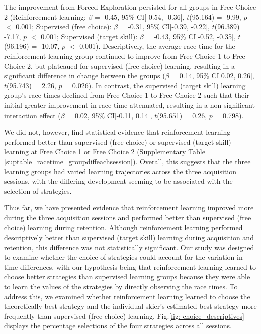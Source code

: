 The improvement from Forced Exploration persisted for all groups in Free Choice 2 (Reinforcement learning: $\beta$ = -0.45, 95\% CI[-0.54, -0.36], $t$(95.164) = -9.99, $p$ $<$ 0.001; Supervised (free choice): $\beta$ = -0.31, 95\% CI[-0.39, -0.22], $t$(96.389) = -7.17, $p$ $<$ 0.001; Supervised (target skill): $\beta$ = -0.43, 95\% CI[-0.52, -0.35], $t$(96.196) = -10.07, $p$ $<$ 0.001). Descriptively, the average race time for the reinforcement learning group continued to improve from Free Choice 1 to Free Choice 2,  but plateaued for supervised (free choice) learning, resulting in a significant difference in change between the groups ($\beta$ = 0.14, 95\% CI[0.02, 0.26], $t$(95.743) = 2.26, $p$ = 0.026). In contrast, the supervised (target skill) learning group's race times declined from Free Choice 1 to Free Choice 2 such that their initial greater improvement in race time  
attenuated, resulting in a non-significant interaction effect ($\beta$ = 0.02, 95\% CI[-0.11, 0.14], $t$(95.651) = 0.26, $p$ = 0.798).

We did not, however, find statistical evidence that reinforcement learning performed better than supervised (free choice) or supervised (target skill) learning at Free Choice 1 or Free Choice 2 (Supplementary Table \ref{suptable_racetime_groupdiffeachsession}). Overall, this suggests that the three learning groups had varied learning trajectories across the three acquisition sessions, with the differing development seeming to be associated with the selection of strategies. 











Thus far, we have presented evidence that reinforcement learning improved more during the three acquisition sessions and performed better than supervised (free choice) learning during retention. Although reinforcement learning performed descriptively better than supervised (target skill) learning during acquisition and retention, this difference was not statistically significant. Our study was designed to examine whether the choice of strategies could account for the variation in time differences, with our hypothesis being that reinforcement learning learned to choose better strategies than supervised learning groups because they were able to learn the values of the strategies by directly observing the race times. To address this, we examined whether reinforcement learning learned to choose the theoretically best strategy and the individual skier's estimated best strategy more frequently than supervised (free choice) learning. Fig.\ref{fig: choice_descriptives} displays the percentage selections of the four strategies across all sessions.


